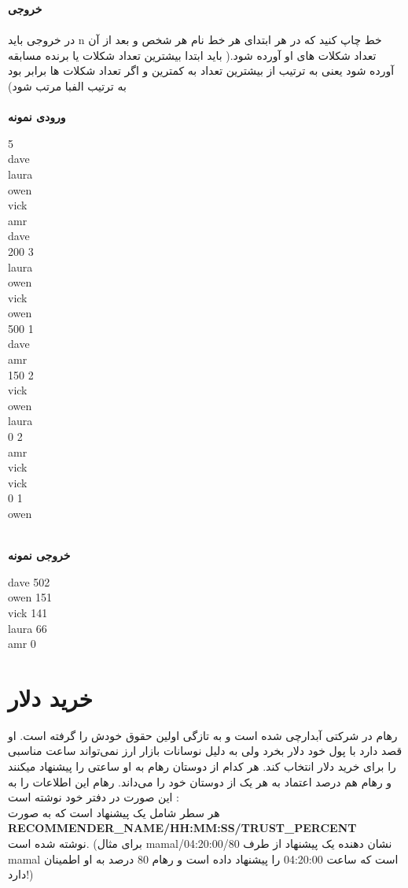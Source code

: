 \documentclass[]{article}
\newcommand{\inputsample}[1]{
    ~\\
    \textbf{ورودی نمونه}
    ~\\
    \begin{tcolorbox}[breakable,boxrule=0pt]
        \begin{latin}
            \large{
                #1
            }
        \end{latin}
    \end{tcolorbox}
}
\newcommand{\outputsample}[1]{
    ~\\
    \textbf{خروجی نمونه}

    \begin{tcolorbox}[breakable,boxrule=0pt]
        \begin{latin}
            \large{
                #1
            }
        \end{latin}
    \end{tcolorbox}
}
\begin{document}
\newpage
\textbf{خروجی}\\
\\
در خروجی باید n خط چاپ کنید که در هر ابتدای هر خط نام هر شخص و بعد از آن تعداد شکلات های او آورده شود.( باید ابتدا بیشترین تعداد شکلات یا برنده مسابقه آورده شود یعنی به ترتیب از بیشترین تعداد به کمترین و اگر تعداد شکلات ها برابر بود به ترتیب الفبا مرتب شود)\\

\inputsample{
5\\
dave\\
laura\\
owen\\
vick\\
amr\\
dave\\
200 3\\
laura\\
owen\\
vick\\
owen\\
500 1\\
dave\\
amr\\
150 2\\
vick\\
owen\\
laura\\
0 2\\
amr\\
vick\\
vick\\
0 1\\
owen
}
\outputsample{
dave 502\\
owen 151\\
vick 141\\
laura 66\\
amr 0
}

\newpage
\section{خرید دلار}


رهام در شرکتی آبدارچی شده است و به تازگی اولین حقوق خودش را گرفته است.
 او قصد دارد با پول خود دلار بخرد ولی به دلیل نوسانات بازار ارز نمی‌تواند ساعت مناسبی را برای خرید دلار انتخاب کند.
  هر کدام از دوستان رهام به او ساعتی را پیشنهاد میکنند و رهام هم درصد اعتماد به هر یک از دوستان خود را می‌داند.
رهام این اطلاعات را به این صورت در دفتر خود نوشته است : 
\\
هر سطر شامل یک پیشنهاد است که به صورت \\
\textbf{RECOMMENDER\_NAME/HH:MM:SS/TRUST\_PERCENT}\\
نوشته شده است. (برای مثال 
mamal/04:20:00/80
نشان دهنده یک پیشنهاد از طرف 
mamal
است که ساعت 
04:20:00
را پیشنهاد داده است و رهام 80 درصد به او اطمینان دارد!)
\end{document}
